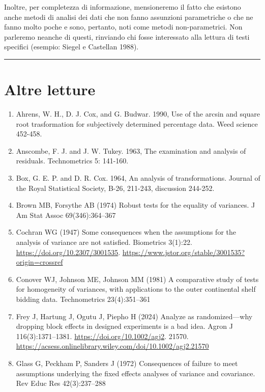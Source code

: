 \documentclass[
  12pt,
]{book}
\providecommand{\tightlist}{%
  \setlength{\itemsep}{0pt}\setlength{\parskip}{0pt}}
\begin{document}
Inoltre, per completezza di informazione, mensioneremo il fatto che esistono anche metodi di analisi dei dati che non fanno assunzioni parametriche o che ne fanno molto poche e sono, pertanto, noti come metodi non-parametrici. Non parleremo neanche di questi, rinviando chi fosse interessato alla lettura di testi specifici (esempio: Siegel e Castellan 1988).

\begin{center}\rule{0.5\linewidth}{0.5pt}\end{center}

\hypertarget{altre-letture-7}{%
\section{Altre letture}\label{altre-letture-7}}

\begin{enumerate}
\def\labelenumi{\arabic{enumi}.}
\tightlist
\item
  Ahrens, W. H., D. J. Cox, and G. Budwar. 1990, Use of the arcsin and square root trasformation for subjectively determined percentage data. Weed science 452-458.
\item
  Anscombe, F. J. and J. W. Tukey. 1963, The examination and analysis of residuals. Technometrics 5: 141-160.
\item
  Box, G. E. P. and D. R. Cox. 1964, An analysis of transformations. Journal of the Royal Statistical Society, B-26, 211-243, discussion 244-252.
\item
  Brown MB, Forsythe AB (1974) Robust tests for the equality of variances. J Am Stat Assoc 69(346):364--367
\item
  Cochran WG (1947) Some consequences when the assumptions for the analysis of variance are not satisfied. Biometrics 3(1):22. \url{https://doi.org/10.2307/3001535}. \url{https://www.jstor.org/stable/3001535?origin=crossref}
\item
  Conover WJ, Johnson ME, Johnson MM (1981) A comparative study of tests for homogeneity of variances, with applications to the outer continental shelf bidding data. Technometrics 23(4):351--361
\item
  Frey J, Hartung J, Ogutu J, Piepho H (2024) Analyze as randomized---why dropping block effects in designed experiments is a bad idea. Agron J 116(3):1371--1381. \url{https://doi.org/10.1002/agj2}. 21570. \url{https://acsess.onlinelibrary.wiley.com/doi/10.1002/agj2.21570}
\item
  Glass G, Peckham P, Sanders J (1972) Consequences of failure to meet assumptions underlying the fixed effects analyses of variance and covariance. Rev Educ Res 42(3):237--288

\end{enumerate}
\end{document}
